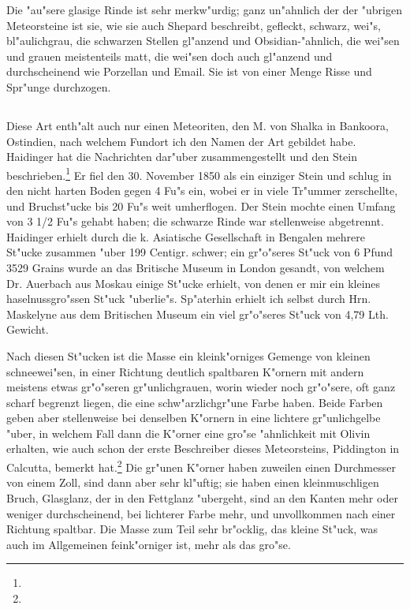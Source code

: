 \documentclass[a4paper, 11pt, oneside]{article}
\begin{document}
Die "au"sere glasige Rinde ist sehr merkw"urdig; ganz un"ahnlich der der "ubrigen Meteorsteine ist sie, wie sie auch Shepard beschreibt, gefleckt, schwarz, wei"s, bl"aulichgrau, die schwarzen Stellen gl"anzend und Obsidian-"ahnlich, die wei"sen und grauen meistenteils matt, die wei"sen doch auch gl"anzend und durchscheinend wie Porzellan und Email. Sie ist von einer Menge Risse und Spr"unge durchzogen.
\subsection{}
\paragraph{}
Diese Art enth"alt auch nur einen Meteoriten, den M. von Shalka in Bankoora, Ostindien, nach welchem Fundort ich den Namen der Art gebildet habe. Haidinger hat die Nachrichten dar"uber zusammengestellt und den Stein beschrieben.\footnote{} Er fiel den 30. November 1850 als ein einziger Stein und schlug in den nicht harten Boden gegen 4 Fu"s ein, wobei er in viele Tr"ummer zerschellte, und Bruchst"ucke bis 20 Fu"s weit umherflogen. Der Stein mochte einen Umfang von 3 1/2 Fu"s gehabt haben; die schwarze Rinde war stellenweise abgetrennt. Haidinger erhielt durch die k. Asiatische Gesellschaft in Bengalen mehrere St"ucke zusammen "uber 199 Centigr. schwer; ein gr"o"seres St"uck von 6 Pfund 3529 Grains wurde an das Britische Museum in London gesandt, von welchem Dr. Auerbach aus Moskau einige St"ucke erhielt, von denen er mir ein kleines haselnussgro"ssen St"uck "uberlie"s. Sp"aterhin erhielt ich selbst durch Hrn. Maskelyne aus dem Britischen Museum ein viel gr"o"seres St"uck von 4,79 Lth. Gewicht.

Nach diesen St"ucken ist die Masse ein kleink"orniges Gemenge von kleinen schneewei"sen, in einer Richtung deutlich spaltbaren K"ornern mit andern meistens etwas gr"o"seren gr"unlichgrauen, worin wieder noch gr"o"sere, oft ganz scharf begrenzt liegen, die eine schw"arzlichgr"une Farbe haben. Beide Farben geben aber stellenweise bei denselben K"ornern in eine lichtere gr"unlichgelbe "uber, in welchem Fall dann die K"orner eine gro"se "ahnlichkeit mit Olivin erhalten, wie auch schon der erste Beschreiber dieses Meteorsteins, Piddington in Calcutta, bemerkt hat.\footnote{} Die gr"unen K"orner haben zuweilen einen Durchmesser von einem Zoll, sind dann aber sehr kl"uftig; sie haben einen kleinmuschligen Bruch, Glasglanz, der in den Fettglanz "ubergeht, sind an den Kanten mehr oder weniger durchscheinend, bei lichterer Farbe mehr, und unvollkommen nach einer Richtung spaltbar. Die Masse zum Teil sehr br"ocklig, das kleine St"uck, was auch im Allgemeinen feink"orniger ist, mehr als das gro"se.
\end{document}
